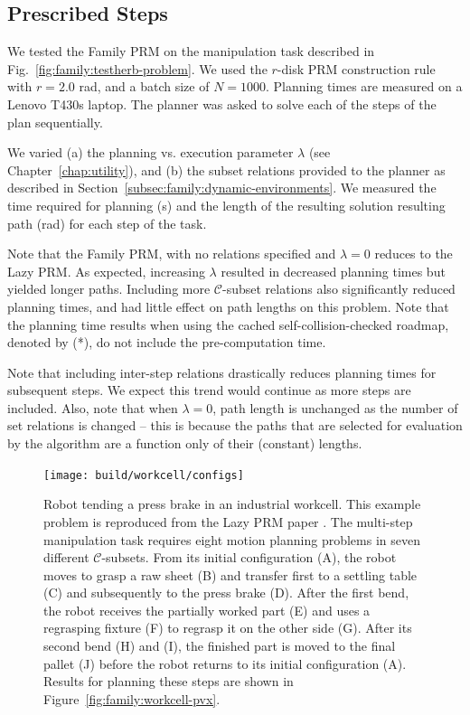 \subsection{Prescribed Steps}

We tested the Family PRM on the manipulation task
described in Fig.~\ref{fig:family:testherb-problem}.
We used the $r$-disk PRM construction rule with $r=2.0$ rad,
and a batch size of $N=1000$.
Planning times are measured on a Lenovo T430s laptop.
The planner was asked to solve each of the steps of the plan
sequentially.

We varied
(a) the planning vs. execution parameter $\lambda$
(see Chapter~\ref{chap:utility}), and
(b) the subset relations provided to the planner
as described in Section~\ref{subsec:family:dynamic-environments}.
We measured the time required for planning (s)
and the length of the resulting solution resulting path (rad)
for each step of the task.

Note that the Family PRM,
with no relations specified and $\lambda=0$
reduces to the Lazy PRM.
As expected,
increasing $\lambda$ resulted in decreased planning times
but yielded longer paths.
Including more $\mathcal{C}$-subset relations
also significantly reduced planning times,
and had little effect on path lengths on this problem.
Note that the planning time results when using
the cached self-collision-checked roadmap, denoted by (*),
do not include the pre-computation time.

Note that including inter-step relations drastically
reduces planning times for subsequent steps.
We expect this trend would continue as more steps are included.
Also, note that when $\lambda=0$,
path length is unchanged as the number of set relations is
changed
-- this is because the paths that are selected for evaluation
by the algorithm are a function only of their (constant) lengths.

\begin{figure}
   \centering
   \texttt{[image: build/workcell/configs]}
   \caption{Robot tending a press brake in an industrial workcell.
      This example problem is reproduced from the Lazy PRM paper
      \citep{bohlin2000lazyprm}.
      The multi-step manipulation task requires eight motion planning
      problems in seven different $\mathcal{C}$-subsets.
      From its initial configuration (A),
      the robot moves to grasp a raw sheet (B)
      and transfer first to a settling table (C)
      and subsequently to the press brake (D).
      After the first bend, the robot receives the partially worked
      part (E) and uses a regrasping fixture (F)
      to regrasp it on the other side (G).
      After its second bend (H) and (I),
      the finished part is moved to the final pallet (J)
      before the robot returns to its initial configuration (A).
      Results for planning these steps are shown in
      Figure~\ref{fig:family:workcell-pvx}.}
\end{figure}

